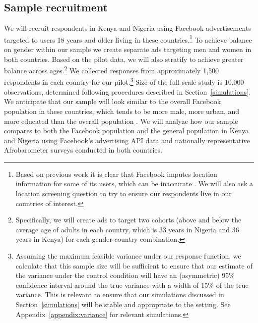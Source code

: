 \documentclass[letterpaper, 12pt, parskip=full,DIV=10]{scrartcl}
\begin{document}
\subsection{Sample recruitment}
We will recruit respondents in Kenya and Nigeria using Facebook advertisements targeted to users 18 years and older living in these countries.\footnote{Based on previous work it is clear that Facebook imputes location information for some of its users, which can be inaccurate \citep{Rosenzweig_2020}. We will also ask a location screening question to try to ensure our respondents live in our countries of interest.} %
To achieve balance on gender within our sample we create separate ads targeting men and women in both countries. {Based on the pilot data, we will also stratify to achieve greater balance across ages.}\footnote{{Specifically, we will create ads to target two cohorts (above and below the average age of adults in each country, which is 33 years in Nigeria and 36 years in Kenya) for each gender-country combination.}} We collected responses from approximately 1,500 respondents in each country for our pilot.\footnote{Assuming the maximum feasible variance under our response function, we calculate that this sample size will be sufficient to ensure that our estimate of the variance under the control condition will have an (asymmetric) 95\% confidence interval around the true variance with a width of 15\% of the true variance. This is relevant to ensure that our simulations discussed in Section~\ref{simulations} will be stable and appropriate to the setting. See Appendix~\ref{appendix:variance} for relevant simulations. } Size of the full scale study is 10,000 observations, determined following procedures described in Section~\ref{simulations}. We anticipate that our sample will look similar to the overall Facebook population in these countries, which tends to be more male, more urban, and more educated than the overall population \citep{Rosenzweig_2020}. We will analyze how our sample compares to both the Facebook population and the general population in Kenya and Nigeria using Facebook's advertising API data and nationally representative Afrobarometer surveys conducted in both countries.
\end{document}
